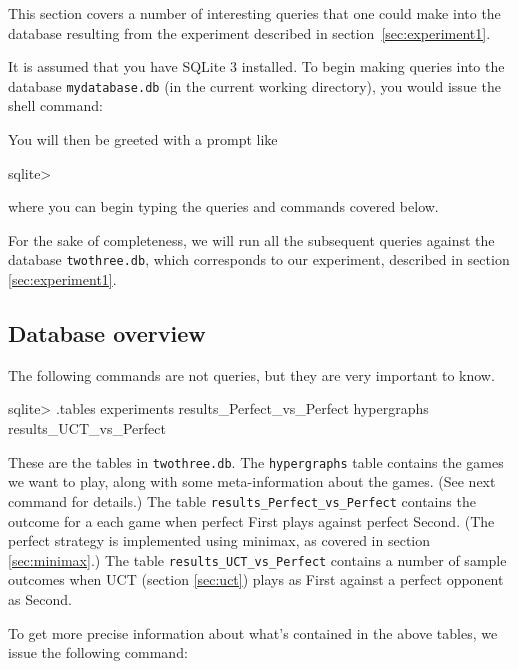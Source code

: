This section covers a number of interesting queries that one could make into the database resulting from the experiment described in section~\ref{sec:experiment1}.

It is assumed that you have SQLite 3 installed.
To begin making queries into the database \texttt{mydatabase.db} (in the current working directory), you would issue the shell command:
You will then be greeted with a prompt like
\begin{code}
sqlite> 
\end{code}
where you can begin typing the queries and commands covered below.

For the sake of completeness, we will run all the subsequent queries against the database \texttt{twothree.db}, which corresponds to our experiment, described in section \ref{sec:experiment1}.

\subsection{Database overview}

The following commands are not queries, but they are very important to know.
\begin{code}
sqlite> .tables
experiments                 results_Perfect_vs_Perfect
hypergraphs                 results_UCT_vs_Perfect  
\end{code}
These are the tables in \texttt{twothree.db}. The \texttt{hypergraphs} table contains the games we want to play, along with some meta-information about the games. (See next command for details.)
The table \texttt{results\_Perfect\_vs\_Perfect} contains the outcome for a each game when perfect First plays against perfect Second. (The perfect strategy is implemented using minimax, as covered in section \ref{sec:minimax}.)
The table \texttt{results\_UCT\_vs\_Perfect} contains a number of sample outcomes when UCT (section \ref{sec:uct}) plays as First against a perfect opponent as Second.

To get more precise information about what's contained in the above tables, we issue the following command:

